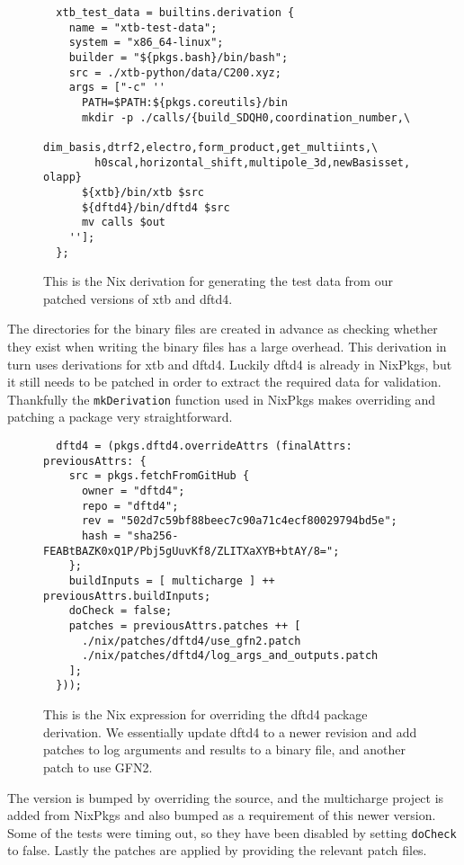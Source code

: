 \begin{figure}[H]
\begin{verbatim}
  xtb_test_data = builtins.derivation {
    name = "xtb-test-data";
    system = "x86_64-linux";
    builder = "${pkgs.bash}/bin/bash";
    src = ./xtb-python/data/C200.xyz;
    args = ["-c" ''
      PATH=$PATH:${pkgs.coreutils}/bin
      mkdir -p ./calls/{build_SDQH0,coordination_number,\
        dim_basis,dtrf2,electro,form_product,get_multiints,\
        h0scal,horizontal_shift,multipole_3d,newBasisset, olapp}
      ${xtb}/bin/xtb $src
      ${dftd4}/bin/dftd4 $src
      mv calls $out
    ''];
  };
\end{verbatim}
\caption{This is the Nix derivation for generating the test data from our patched versions of xtb and dftd4.}
\label{fig:xtb-test-data}
\end{figure}

The directories for the binary files are created in advance as checking whether they exist when writing the binary files has a large overhead.
This derivation in turn uses derivations for xtb and dftd4. Luckily dftd4 is already in NixPkgs, but it still needs to be patched in order to extract the required data for validation. Thankfully the \verb|mkDerivation| function used in NixPkgs makes overriding and patching a package very straightforward. 

\begin{figure}[H]
\begin{verbatim}
  dftd4 = (pkgs.dftd4.overrideAttrs (finalAttrs: previousAttrs: {
    src = pkgs.fetchFromGitHub {
      owner = "dftd4";
      repo = "dftd4";
      rev = "502d7c59bf88beec7c90a71c4ecf80029794bd5e";
      hash = "sha256-FEABtBAZK0xQ1P/Pbj5gUuvKf8/ZLITXaXYB+btAY/8=";
    };
    buildInputs = [ multicharge ] ++ previousAttrs.buildInputs;
    doCheck = false;
    patches = previousAttrs.patches ++ [
      ./nix/patches/dftd4/use_gfn2.patch
      ./nix/patches/dftd4/log_args_and_outputs.patch
    ];
  }));
\end{verbatim}
\caption{This is the Nix expression for overriding the dftd4 package derivation. We essentially update dftd4 to a newer revision and add patches to log arguments and results to a binary file, and another patch to use GFN2.}
\label{fig:dftf4-drv}
\end{figure}

The version is bumped by overriding the source, and the multicharge project is added from NixPkgs and also bumped as a requirement of this newer version. Some of the tests were timing out, so they have been disabled by setting \verb|doCheck| to false. Lastly the patches are applied by providing the relevant patch files.

